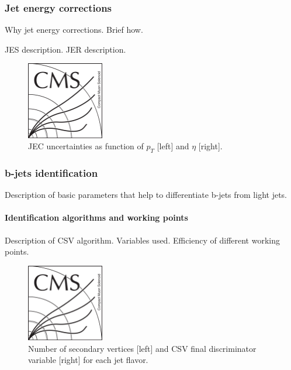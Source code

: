 \subsubsection{Jet energy corrections}

Why jet energy corrections. Brief how.

JES description. JER description.

\begin{figure}[!Hhtbp]
  \begin{center}
    \includegraphics[width=0.3\textwidth]{figs/CMSlogo.png}
    \caption{JEC uncertainties as function of $p_{T}$ [left] and $\eta$ [right].}
    \label{fig:JEC}
  \end{center}
\end{figure}

\subsubsection{b-jets identification}

Description of basic parameters that help to differentiate b-jets from light jets. 

\paragraph{Identification algorithms and working points}

Description of CSV algorithm. Variables used. Efficiency of different working points.

\begin{figure}[!Hhtbp]
  \begin{center}
    \includegraphics[width=0.3\textwidth]{figs/CMSlogo.png}
    \caption{Number of secondary vertices [left] and CSV final discriminator variable [right] for each jet flavor.}
    \label{fig:CSVVar}
  \end{center}
\end{figure}

